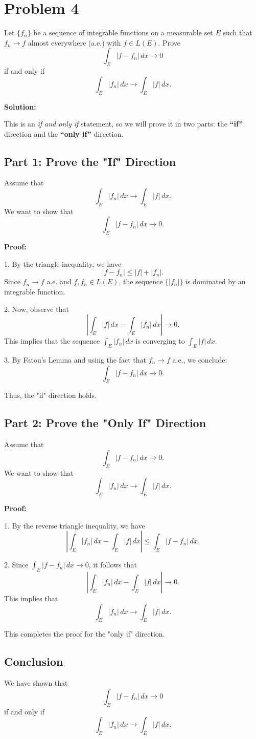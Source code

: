 
\section*{Problem 4}
Let \( \{ f_n \} \) be a sequence of integrable functions on a measurable set \( E \) such that \( f_n \to f \) almost everywhere (a.e.) with \( f \in L(E) \). Prove
\[
\int_E |f - f_n| \, dx \to 0
\]
if and only if
\[
\int_E |f_n| \, dx \to \int_E |f| \, dx.
\]

\textbf{Solution:}

This is an \textit{if and only if} statement, so we will prove it in two parts: the \textbf{\textquotedblleft if\textquotedblright} direction and the \textbf{\textquotedblleft only if\textquotedblright} direction.

\subsection*{Part 1: Prove the "If" Direction}
Assume that
\[
\int_E |f_n| \, dx \to \int_E |f| \, dx.
\]
We want to show that
\[
\int_E |f - f_n| \, dx \to 0.
\]

\textbf{Proof:}

1. By the triangle inequality, we have
   \[
   |f - f_n| \leq |f| + |f_n|.
   \]
   Since \( f_n \to f \) a.e. and \( f, f_n \in L(E) \), the sequence \( \{ |f_n| \} \) is dominated by an integrable function.

2. Now, observe that
   \[
   \left| \int_E |f| \, dx - \int_E |f_n| \, dx \right| \to 0.
   \]
   This implies that the sequence \( \int_E |f_n| \, dx \) is converging to \( \int_E |f| \, dx \).

3. By Fatou's Lemma and using the fact that \( f_n \to f \) a.e., we conclude:
   \[
   \int_E |f - f_n| \, dx \to 0.
   \]
   
Thus, the "if" direction holds.

\subsection*{Part 2: Prove the "Only If" Direction}
Assume that
\[
\int_E |f - f_n| \, dx \to 0.
\]
We want to show that
\[
\int_E |f_n| \, dx \to \int_E |f| \, dx.
\]

\textbf{Proof:}

1. By the reverse triangle inequality, we have
   \[
   \left| \int_E |f_n| \, dx - \int_E |f| \, dx \right| \leq \int_E |f - f_n| \, dx.
   \]

2. Since \( \int_E |f - f_n| \, dx \to 0 \), it follows that
   \[
   \left| \int_E |f_n| \, dx - \int_E |f| \, dx \right| \to 0.
   \]
   This implies that
   \[
   \int_E |f_n| \, dx \to \int_E |f| \, dx.
   \]

This completes the proof for the "only if" direction. 

\subsection*{Conclusion}
We have shown that
\[
\int_E |f - f_n| \, dx \to 0
\]
if and only if
\[
\int_E |f_n| \, dx \to \int_E |f| \, dx.
\]
